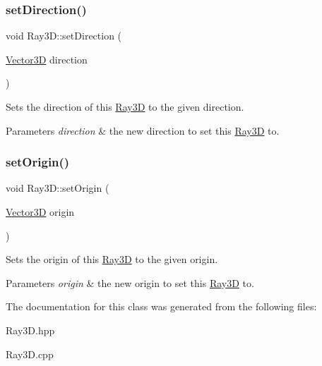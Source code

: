 \subsubsection{\texorpdfstring{set\+Direction()}{setDirection()}}
{\footnotesize\ttfamily void Ray3\+D\+::set\+Direction (\begin{DoxyParamCaption}\item[{\hyperlink{classVector3D}{Vector3D}}]{direction }\end{DoxyParamCaption})}

Sets the direction of this \hyperlink{classRay3D}{Ray3D} to the given direction. 
\begin{DoxyParams}{Parameters}
{\em direction} & the new direction to set this \hyperlink{classRay3D}{Ray3D} to. \\
\hline
\end{DoxyParams}
\mbox{\label{classRay3D_af55f9d1ca3d2b9f1eba5d7e6cf03b660}} 
\subsubsection{\texorpdfstring{set\+Origin()}{setOrigin()}}
{\footnotesize\ttfamily void Ray3\+D\+::set\+Origin (\begin{DoxyParamCaption}\item[{\hyperlink{classVector3D}{Vector3D}}]{origin }\end{DoxyParamCaption})}

Sets the origin of this \hyperlink{classRay3D}{Ray3D} to the given origin. 
\begin{DoxyParams}{Parameters}
{\em origin} & the new origin to set this \hyperlink{classRay3D}{Ray3D} to. \\
\hline
\end{DoxyParams}


The documentation for this class was generated from the following files\+:\begin{DoxyCompactItemize}
\item 
Ray3\+D.\+hpp\item 
Ray3\+D.\+cpp\end{DoxyCompactItemize}
